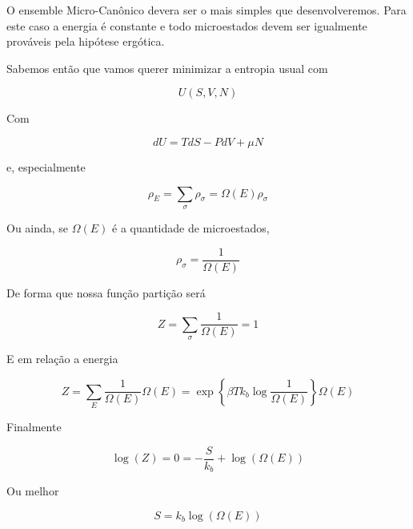 O ensemble Micro-Canônico devera ser o mais simples que desenvolveremos. Para este caso a energia é constante e todo microestados devem ser igualmente prováveis pela hipótese ergótica.

\begin{center}
\end{center}

Sabemos então que vamos querer minimizar a entropia usual com

\begin{equation}
	U(S,V,N)  
\end{equation}

Com 

\[
	dU = TdS - PdV + \mu N
\]

e, especialmente

\[
\rho_E = \sum_{\sigma} \rho_\sigma = \Omega(E) \rho_\sigma
\]

Ou ainda, se $\Omega(E)$ é a quantidade de microestados,

\[
	 \rho_\sigma = \frac{1}{\Omega(E)}
\]

De forma que nossa função partição será

\[
	Z = \sum_\sigma \frac{1}{\Omega(E)} = 1
\]

E em relação a energia

\[
	Z = \sum_E \frac{1}{\Omega(E)} \Omega(E) = \exp{\left\lbrace \beta T k_b \log{\frac{1}{\Omega(E)}} \right\rbrace } \Omega(E) 
\]

Finalmente

\[
 \log{(Z)} = 0 = -\frac{S}{k_b} + \log(\Omega(E))
\]

Ou melhor

\begin{equation}
	S = k_b \log{(\Omega(E))}
\end{equation}